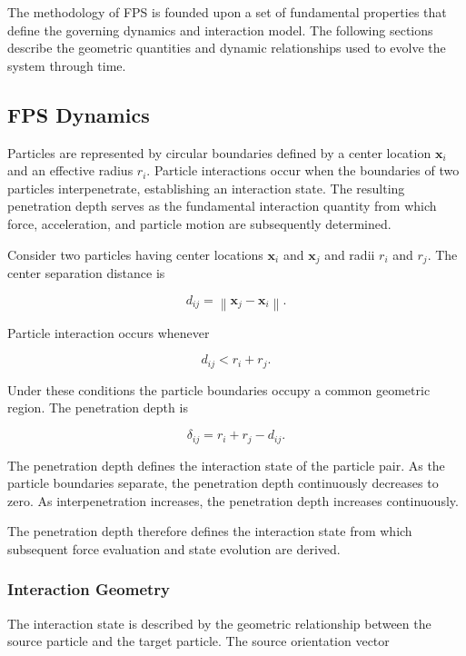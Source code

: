 The methodology of FPS is founded upon a set of
fundamental properties that define the governing
dynamics and interaction model. The following sections 
describe the geometric quantities and 
dynamic relationships used to evolve the system 
through time.


\subsection{FPS Dynamics}

Particles are represented by circular boundaries
defined by a center location $\mathbf{x}_i$ and an
effective radius $r_i$. Particle interactions occur
when the boundaries of two particles interpenetrate,
establishing an interaction state. The resulting penetration 
depth serves as the fundamental interaction quantity 
from which force, acceleration, and particle motion 
are subsequently determined.

Consider two particles having center locations
$\mathbf{x}_i$ and $\mathbf{x}_j$ and radii
$r_i$ and $r_j$. The center separation distance is

\begin{equation}
d_{ij}
=
\left\|
\mathbf{x}_j-\mathbf{x}_i
\right\|.
\end{equation}

Particle interaction occurs whenever

\begin{equation}
d_{ij}<r_i+r_j.
\end{equation}

Under these conditions the particle boundaries
occupy a common geometric region. The penetration
depth is

\begin{equation}
\delta_{ij}
=
r_i+r_j-d_{ij}.
\end{equation}

The penetration depth defines the interaction state
of the particle pair. As the particle boundaries
separate, the penetration depth continuously
decreases to zero. As interpenetration increases,
the penetration depth increases continuously.

The penetration depth therefore defines the
interaction state from which subsequent force
evaluation and state evolution are derived.


\subsubsection{Interaction Geometry}
The interaction state is described by the geometric
relationship between the source particle and the
target particle. The source orientation vector

